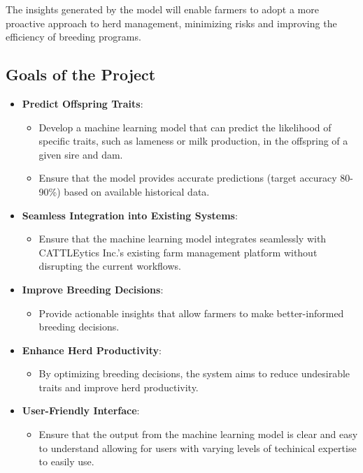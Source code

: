 \documentclass[12pt]{article}
\begin{document}
The insights generated by the model will enable farmers to adopt a more 
proactive approach to herd management, minimizing risks and improving the 
efficiency of breeding programs.


\subsection{Goals of the Project}
\begin{itemize}
    \item \textbf{Predict Offspring Traits}:
    \begin{itemize}
        \item Develop a machine learning model that can predict the likelihood 
        of specific traits, such as lameness or milk production, in the 
        offspring of a given sire and dam.
        \item Ensure that the model provides accurate predictions (target 
        accuracy 80-90\%) based on available historical data.
    \end{itemize}
    
    \item \textbf{Seamless Integration into Existing Systems}:
    \begin{itemize}
        \item Ensure that the machine learning model integrates seamlessly with 
        CATTLEytics Inc.'s existing farm management platform without disrupting 
        the current workflows.
    \end{itemize}

    \item \textbf{Improve Breeding Decisions}:
    \begin{itemize}
        \item Provide actionable insights that allow farmers to make 
        better-informed breeding decisions.
    \end{itemize}
    
    \item \textbf{Enhance Herd Productivity}:
    \begin{itemize}
        \item By optimizing breeding decisions, the system aims to reduce 
        undesirable traits and improve herd productivity.
    \end{itemize}

    \item \textbf{User-Friendly Interface}:
    \begin{itemize}
        \item Ensure that the output from the machine learning model is clear 
        and easy to understand allowing for users with varying levels of 
        techinical expertise to easily use.
    \end{itemize}
\end{itemize}
\end{document}

